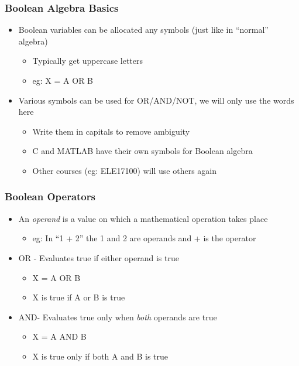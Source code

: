 \documentclass[14pt]{beamer}
\begin{document}
\begin{frame}
\frametitle{Boolean Algebra Basics}
\begin{itemize}
\item Boolean variables can be allocated any symbols (just like in ``normal'' algebra)
	\begin{itemize}
		\item Typically get uppercase letters
		\item eg: X = A OR B
	\end{itemize}
\item Various symbols can be used for OR/AND/NOT, we will only use the words here
	\begin{itemize}
		\item Write them in capitals to remove ambiguity
		\item C and MATLAB have their own symbols for Boolean algebra
		\item Other courses (eg: ELE17100) will use others again
	\end{itemize}
\end{itemize}
\end{frame}

\begin{frame}
\frametitle{Boolean Operators}
\begin{itemize}
\item An \textit{operand} is a value on which a mathematical operation takes place
	\begin{itemize}
		\item eg: In ``1 + 2'' the 1 and 2 are operands and + is the operator
	\end{itemize}
\item OR - Evaluates true if either operand is true
	\begin{itemize}
		\item X = A OR B
		\item X is true if A or B is true
	\end{itemize}
\item AND- Evaluates true only when \textit{both} operands are true
	\begin{itemize}
		\item X = A AND B
		\item X is true only if both A and B is true
	\end{itemize}
\end{itemize}
\end{frame}
\end{document}

